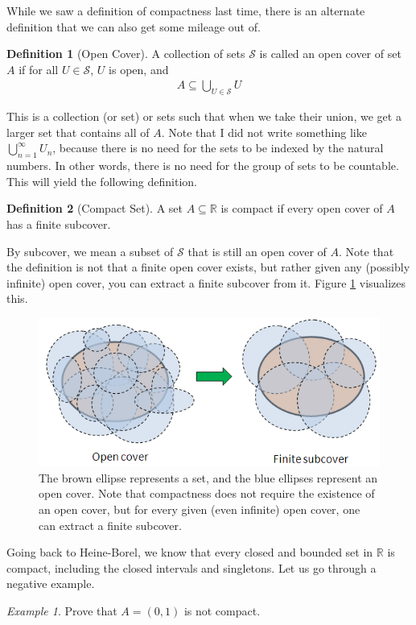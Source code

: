 \documentclass[11pt]{article}
\newcommand{\R}{\ensuremath{\mathbb R}}
\renewcommand{\S}{\ensuremath{\mathcal S}}
\newcommand{\sse}{\subseteq}
\theoremstyle{plain}
\theoremstyle{definition}
\newtheorem{defi}{Definition}[section]
\theoremstyle{remark}
\newtheorem{exm}{Example}[section]
\begin{document}
While we saw a definition of compactness last time, there is an alternate definition that we can also get some mileage out of.
\begin{defi}[Open Cover]
    A collection of sets $\mathcal{S}$ is called an open cover of set $A$ if for all $U \in \mathcal{S}$, $U$ is open, and
    \begin{align*}
        A \sse \bigcup_{U \in \S} U
    \end{align*}
\end{defi}
This is a collection (or set) or sets such that when we take their union, we get a larger set that contains all of $A$. Note that I did not write something like $\bigcup_{n=1}^\infty U_n$, because there is no need for the sets to be indexed by the natural numbers. In other words, there is no need for the group of sets to be countable. This will yield the following definition.
\begin{defi}[Compact Set]
    A set $A \sse \R$ is compact if every open cover of $A$ has a finite subcover.
\end{defi}
By subcover, we mean a subset of $\S$ that is still an open cover of $A$. Note that the definition is not that a finite open cover exists, but rather given any (possibly infinite) open cover, you can extract a finite subcover from it. Figure \ref{fig:subcover} visualizes this.
\begin{figure}
    \centering
    \includegraphics[width=0.8\linewidth]{figures/finite_subcover.png}
    \caption{The brown ellipse represents a set, and the blue ellipses represent an open cover. Note that compactness does not require the existence of an open cover, but for every given (even infinite) open cover, one can extract a finite subcover.}
    \label{fig:subcover}
\end{figure}
Going back to Heine-Borel, we know that every closed and bounded set in $\R$ is compact, including the closed intervals and singletons. Let us go through a negative example.
\begin{exm}
    Prove that $A = (0, 1)$ is not compact.
\end{exm}
\end{document}
